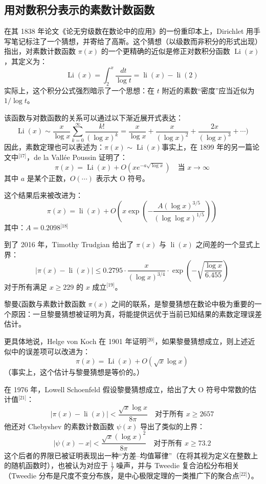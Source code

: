 \subsection{用对数积分表示的素数计数函数}
在其 1838 年论文《论无穷级数在数论中的应用》的一份重印本上，Dirichlet 用手写笔记标注了一个猜想，并寄给了高斯。这个猜想（以级数而非积分的形式出现）指出，对素数计数函数 $\pi(x)$ 的一个更精确的近似是修正对数积分函数 $\operatorname{Li}(x)$，其定义为：
$$
\operatorname{Li}(x) = \int_{2}^{x} \frac{dt}{\log t} = \operatorname{li}(x) - \operatorname{li}(2)~
$$
实际上，这个积分公式强烈暗示了一个思想：在 $t$ 附近的素数“密度”应当近似为 $1/\log t$。

该函数与对数函数的关系可以通过以下渐近展开式表达：
$$
\operatorname{Li}(x) \sim \frac{x}{\log x} \sum_{k=0}^{\infty} \frac{k!}{(\log x)^k} = \frac{x}{\log x} + \frac{x}{(\log x)^2} + \frac{2x}{(\log x)^3} + \cdots)~
$$
因此，素数定理也可以表述为：$\pi(x) \sim \operatorname{Li}(x)$事实上，在 1899 年的另一篇论文中\(^\text{[17]}\)，de la Vallée Poussin 证明了：
$$
\pi(x) = \operatorname{Li}(x) + O\left(x e^{-a \sqrt{\log x}}\right) \quad \text{当 } x \to \infty~
$$
其中 $a$ 是某个正数，$O(\cdots)$ 表示大 O 符号。

这个结果后来被改进为：
$$
\pi(x) = \operatorname{li}(x) + O\left(x \exp\left(-\frac{A (\log x)^{3/5}}{(\log \log x)^{1/5}}\right)\right)~
$$
其中：$A = 0.2098$\(^\text{[18]}\)

到了 2016 年，Timothy Trudgian 给出了 $\pi(x)$ 与 $\operatorname{li}(x)$ 之间差的一个显式上界：
$$
\left| \pi(x) - \operatorname{li}(x) \right| \leq 0.2795 \cdot \frac{x}{(\log x)^{3/4}} \cdot \exp\left(-\sqrt{\frac{\log x}{6.455}}\right)~
$$
对于所有满足 $x \geq 229$ 的 $x$ 成立\(^\text{[19]}\)。

黎曼ζ函数与素数计数函数 $\pi(x)$ 之间的联系，是黎曼猜想在数论中极为重要的一个原因：一旦黎曼猜想被证明为真，将能提供远优于当前已知结果的素数定理误差估计。

更具体地说，Helge von Koch 在 1901 年证明\(^\text{[20]}\)，如果黎曼猜想成立，则上述近似中的误差项可以改进为：
$$
\pi(x) = \operatorname{Li}(x) + O\left(\sqrt{x} \log x\right)~
$$
（事实上，这个估计与黎曼猜想是等价的。）

在 1976 年，Lowell Schoenfeld 假设黎曼猜想成立，给出了大 O 符号中常数的估计值\(^\text{[21]}\)：
$$
\left| \pi(x) - \operatorname{li}(x) \right| < \frac{\sqrt{x} \log x}{8\pi}
\quad \text{对于所有 } x \geq 2657~
$$
他还对 Chebyshev 的素数计数函数 $\psi(x)$ 导出了类似的上界：
$$
\left| \psi(x) - x \right| < \frac{\sqrt{x} (\log x)^2}{8\pi}
\quad \text{对于所有 } x \geq 73.2~
$$
这个后者的界限已被证明表现出一种“方差–均值幂律”（在将其视为定义在整数上的随机函数时），也被认为对应于 $\frac{1}{f}$ 噪声，并与 Tweedie 复合泊松分布相关（Tweedie 分布是尺度不变分布族，是中心极限定理的一类推广下的聚合点\(^\text{[22]}\)）。

